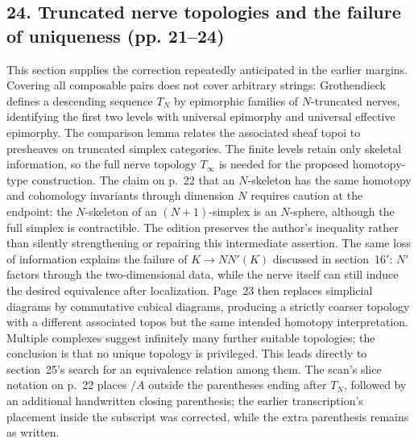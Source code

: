 \documentclass[10pt,oneside]{book}
\begin{document}
\subsection*{24. Truncated nerve topologies and the failure of uniqueness (pp. 21--24)}
This section supplies the correction repeatedly anticipated in the earlier margins. Covering all composable pairs does not cover arbitrary strings: Grothendieck defines a descending sequence $T_N$ by epimorphic families of $N$-truncated nerves, identifying the first two levels with universal epimorphy and universal effective epimorphy. The comparison lemma relates the associated sheaf topoi to presheaves on truncated simplex categories. The finite levels retain only skeletal information, so the full nerve topology $T_\infty$ is needed for the proposed homotopy-type construction. The claim on p.~22 that an $N$-skeleton has the same homotopy and cohomology invariants through dimension $N$ requires caution at the endpoint: the $N$-skeleton of an $(N+1)$-simplex is an $N$-sphere, although the full simplex is contractible. The edition preserves the author's inequality rather than silently strengthening or repairing this intermediate assertion. The same loss of information explains the failure of $K\to NN'(K)$ discussed in section~16$'$: $N'$ factors through the two-dimensional data, while the nerve itself can still induce the desired equivalence after localization. Page~23 then replaces simplicial diagrams by commutative cubical diagrams, producing a strictly coarser topology with a different associated topos but the same intended homotopy interpretation. Multiple complexes suggest infinitely many further suitable topologies; the conclusion is that no unique topology is privileged. This leads directly to section~25's search for an equivalence relation among them. The scan's slice notation on p.~22 places $/A$ outside the parentheses ending after $T_N$, followed by an additional handwritten closing parenthesis; the earlier transcription's placement inside the subscript was corrected, while the extra parenthesis remains as written.
\end{document}
